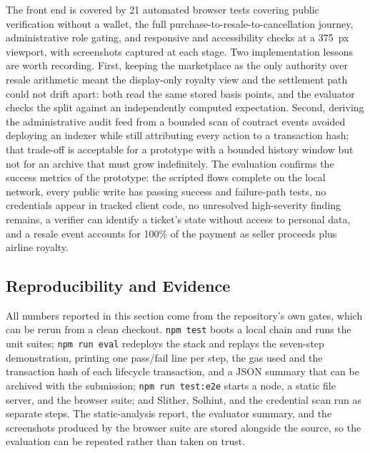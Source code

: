 \documentclass[conference]{IEEEtran}
\begin{document}
The front end is covered by 21 automated browser tests covering public verification without a wallet, the full purchase-to-resale-to-cancellation journey, administrative role gating, and responsive and accessibility checks at a 375~px viewport, with screenshots captured at each stage. Two implementation lessons are worth recording. First, keeping the marketplace as the only authority over resale arithmetic meant the display-only royalty view and the settlement path could not drift apart: both read the same stored basis points, and the evaluator checks the split against an independently computed expectation. Second, deriving the administrative audit feed from a bounded scan of contract events avoided deploying an indexer while still attributing every action to a transaction hash; that trade-off is acceptable for a prototype with a bounded history window but not for an archive that must grow indefinitely. The evaluation confirms the success metrics of the prototype: the scripted flows complete on the local network, every public write has passing success and failure-path tests, no credentials appear in tracked client code, no unresolved high-severity finding remains, a verifier can identify a ticket's state without access to personal data, and a resale event accounts for 100\% of the payment as seller proceeds plus airline royalty.

\subsection{Reproducibility and Evidence}
All numbers reported in this section come from the repository's own gates, which can be rerun from a clean checkout. \texttt{npm test} boots a local chain and runs the unit suites; \texttt{npm run eval} redeploys the stack and replays the seven-step demonstration, printing one pass/fail line per step, the gas used and the transaction hash of each lifecycle transaction, and a JSON summary that can be archived with the submission; \texttt{npm run test:e2e} starts a node, a static file server, and the browser suite; and Slither, Solhint, and the credential scan run as separate steps. The static-analysis report, the evaluator summary, and the screenshots produced by the browser suite are stored alongside the source, so the evaluation can be repeated rather than taken on trust.
\end{document}
